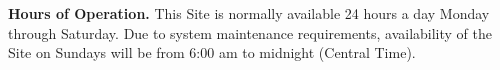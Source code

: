 \textbf{Hours of Operation.}
This Site is normally available 24 hours a day Monday through Saturday. Due to
system maintenance requirements, availability of the Site on Sundays will be
from 6:00 am to midnight (Central Time).